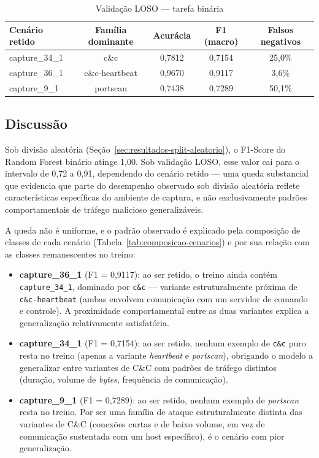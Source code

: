 \begin{table}[htbp]
\centering
\caption{Validação LOSO — tarefa binária}
\label{tab:loso-binario}
\begin{tabular}{@{}lcccc@{}}
\toprule
\textbf{Cenário retido} & \textbf{Família dominante} & \textbf{Acurácia} & \textbf{F1 (macro)} & \textbf{Falsos negativos} \\
\midrule
capture\_34\_1 & c\&c & 0{,}7812 & 0{,}7154 & 25{,}0\% \\
capture\_36\_1 & c\&c-heartbeat & 0{,}9670 & 0{,}9117 & 3{,}6\% \\
capture\_9\_1 & portscan & 0{,}7438 & 0{,}7289 & 50{,}1\% \\
\bottomrule
\end{tabular}
\end{table}

\subsection{Discussão}

Sob divisão aleatória (Seção~\ref{sec:resultados-split-aleatorio}), o F1-Score do Random Forest binário atinge 1{,}00. Sob validação LOSO, esse valor cai para o intervalo de 0{,}72 a 0{,}91, dependendo do cenário retido — uma queda substancial que evidencia que parte do desempenho observado sob divisão aleatória reflete características específicas do ambiente de captura, e não exclusivamente padrões comportamentais de tráfego malicioso generalizáveis.

A queda não é uniforme, e o padrão observado é explicado pela composição de classes de cada cenário (Tabela~\ref{tab:composicao-cenarios}) e por sua relação com as classes remanescentes no treino:

\begin{itemize}
    \item \textbf{capture\_36\_1} (F1 = 0{,}9117): ao ser retido, o treino ainda contém \texttt{capture\_34\_1}, dominado por \texttt{c\&c} — variante estruturalmente próxima de \texttt{c\&c-heartbeat} (ambas envolvem comunicação com um servidor de comando e controle). A proximidade comportamental entre as duas variantes explica a generalização relativamente satisfatória.
    \item \textbf{capture\_34\_1} (F1 = 0{,}7154): ao ser retido, nenhum exemplo de \texttt{c\&c} puro resta no treino (apenas a variante \textit{heartbeat} e \textit{portscan}), obrigando o modelo a generalizar entre variantes de C\&C com padrões de tráfego distintos (duração, volume de \textit{bytes}, frequência de comunicação).
    \item \textbf{capture\_9\_1} (F1 = 0{,}7289): ao ser retido, nenhum exemplo de \textit{portscan} resta no treino. Por ser uma família de ataque estruturalmente distinta das variantes de C\&C (conexões curtas e de baixo volume, em vez de comunicação sustentada com um host específico), é o cenário com pior generalização.
\end{itemize}

